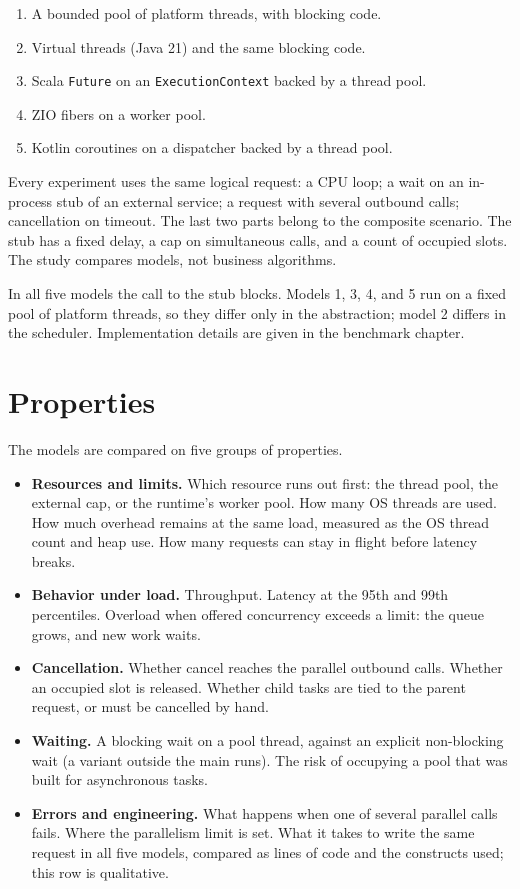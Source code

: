 \begin{enumerate}
\item A bounded pool of platform threads, with blocking code.
\item Virtual threads (Java 21) and the same blocking code.
\item Scala \texttt{Future} on an \texttt{ExecutionContext} backed by a thread pool.
\item ZIO fibers on a worker pool.
\item Kotlin coroutines on a dispatcher backed by a thread pool.
\end{enumerate}

Every experiment uses the same logical request: a CPU loop; a wait on an in-process stub of an external service; a request with several outbound calls; cancellation on timeout. The last two parts belong to the composite scenario. The stub has a fixed delay, a cap on simultaneous calls, and a count of occupied slots. The study compares models, not business algorithms.

In all five models the call to the stub blocks. Models 1, 3, 4, and 5 run on a fixed pool of platform threads, so they differ only in the abstraction; model 2 differs in the scheduler. Implementation details are given in the benchmark chapter.

\section{Properties}

The models are compared on five groups of properties.

\begin{itemize}
\item \textbf{Resources and limits.} Which resource runs out first: the thread pool, the external cap, or the runtime’s worker pool. How many OS threads are used. How much overhead remains at the same load, measured as the OS thread count and heap use. How many requests can stay in flight before latency breaks.
\item \textbf{Behavior under load.} Throughput. Latency at the 95th and 99th percentiles. Overload when offered concurrency exceeds a limit: the queue grows, and new work waits.
\item \textbf{Cancellation.} Whether cancel reaches the parallel outbound calls. Whether an occupied slot is released. Whether child tasks are tied to the parent request, or must be cancelled by hand.
\item \textbf{Waiting.} A blocking wait on a pool thread, against an explicit non-blocking wait (a variant outside the main runs). The risk of occupying a pool that was built for asynchronous tasks.
\item \textbf{Errors and engineering.} What happens when one of several parallel calls fails. Where the parallelism limit is set. What it takes to write the same request in all five models, compared as lines of code and the constructs used; this row is qualitative.
\end{itemize}

